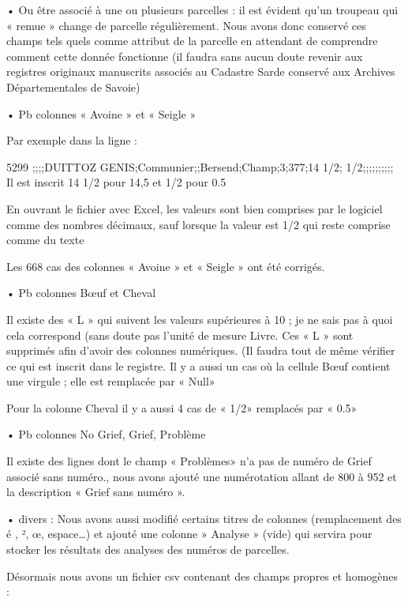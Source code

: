\documentclass[12pt,a4paper]{report}
\begin{document}
•	Ou être associé à une ou plusieurs parcelles : il est évident qu’un troupeau qui « remue » change de parcelle régulièrement.
Nous avons donc conservé ces champs tels quels comme attribut de la parcelle en attendant de comprendre comment cette donnée fonctionne (il faudra sans aucun doute revenir aux registres originaux manuscrits associés au Cadastre Sarde conservé aux Archives Départementales de Savoie)

•	Pb colonnes « Avoine » et « Seigle »

Par exemple dans la ligne :

5299 ;;;;DUITTOZ GENIS;Communier;;Bersend;Champ;3;377;14 1/2; 1/2;;;;;;;;;;\\
Il est inscrit 14 1/2 pour 14,5 et 1/2 pour 0.5

En ouvrant le fichier avec Excel, les valeurs sont bien comprises par le logiciel comme des nombres décimaux, sauf lorsque la valeur est 1/2 qui reste comprise comme du texte

Les 668 cas des colonnes « Avoine » et « Seigle » ont été corrigés.

•	Pb colonnes Bœuf et Cheval

Il existe des « L » qui suivent les valeurs supérieures à 10 ; je ne sais pas à quoi cela correspond (sans doute pas l’unité de mesure Livre. Ces « L » sont supprimés afin d’avoir des colonnes numériques. (Il faudra tout de même vérifier ce qui est inscrit dans le registre.
Il y a aussi un cas où la cellule Bœuf contient une virgule ; elle est remplacée par « Null»

Pour la colonne Cheval il y a aussi 4 cas de « 1/2» remplacés par « 0.5»

•	Pb colonnes No Grief, Grief, Problème

Il existe des lignes dont le champ « Problèmes» n’a pas de numéro de Grief associé sans numéro., nous avons ajouté une numérotation allant de 800 à 952 et la description « Grief sans numéro ».

•	divers :
Nous avons aussi modifié certains titres de colonnes (remplacement des é , ², œ, espace…) et ajouté une colonne » Analyse » (vide) qui servira pour stocker les résultats des analyses des numéros de parcelles.

Désormais nous avons un fichier csv contenant des champs propres et homogènes :
\end{document}
